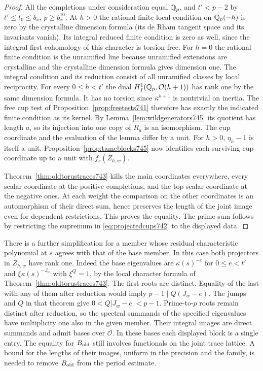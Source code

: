 \documentclass[a4paper,11pt]{article}
\theoremstyle{definition}
\theoremstyle{remark}
\numberwithin{equation}{section}
\begin{document}
\begin{proof}
All the completions under consideration equal \(\mathbb Q_p\),
and \(t'<p-2\) by \(t'\le t_0\le b_x\), \(p\ge b_x^{10}\).
At \(h>0\) the rational finite local condition on
\(\mathbb Q_p(-h)\) is zero by the crystalline dimension formula
(its de Rham tangent space and its invariants vanish).
Its integral reduced finite condition is zero as well, since
the integral first cohomology of this character is torsion-free.
For \(h=0\) the rational finite condition is the unramified line
because unramified extensions are crystalline and the crystalline
dimension formula gives dimension one. The integral condition and
its reduction consist of all unramified classes by local reciprocity.
For every \(0\le h<t'\) the dual \(H^1_f(\mathbb Q_p,\mathcal O(h+1))\)
has rank one by the same dimension formula. It has no torsion
since \(\bar\kappa^{h+1}\) is nontrivial on inertia. The free
cup test of Proposition~\ref{prop:freetests741} therefore
has exactly the indicated finite condition as its kernel.
By Lemma~\ref{lem:wildgenerators745} its quotient has length
\(a\), so its injection into one copy of \(R_a\) is an
isomorphism. The cup coordinate and the evaluation of the lemma
differ by a unit. For \(h>0\), \(\eta_h-1\) is itself a unit.
Proposition~\ref{prop:tameblocks745} now identifies each
surviving cup coordinate up to a unit with \(f_c(Z_{h,w})\).

Theorem~\ref{thm:oldtorustraces743} kills the main coordinates
everywhere, every scalar coordinate at the positive completions,
and the top scalar coordinate at the negative ones. At each weight
the comparison on the other coordinates is an automorphism of
their direct sum, hence preserves the length of the joint image
even for dependent restrictions. This proves the equality. The
prime sum follows by restricting the supremum in
\eqref{eq:projectedcups742} to the displayed data.
\end{proof}

There is a further simplification for a member whose residual
characteristic polynomial at \(s\) agrees with that of the base
member. In this case both projectors in \(Z_{h,w}\) have rank one.
Indeed the base eigenvalues are \(\kappa(s)^{-e}\) for
\(0\le e<t'\) and \(\xi\kappa(s)^{-J_w}\) with \(\xi^Q=1\),
by the local character formula of Theorem~\ref{thm:oldtorustraces743}.
The first roots are distinct. Equality of the last with any of
them after reduction would imply \(p-1\mid Q(J_w-e)\).
The jumps and \(Q\) in that theorem give
\(0<Q|J_w-e|<p-1\). Prime-to-\(p\) roots remain distinct after
reduction, so the spectral summands of the specified eigenvalues
have multiplicity one also in the given member. Their integral
images are direct summands and admit bases over \(\mathcal O\).
In these bases each displayed block is a single entry. The
equality for \(B_{\rm old}\) still involves functionals on the
joint trace lattice. A bound for the lengths of their images,
uniform in the precision and the family, is needed to remove
\(B_{\rm old}\) from the period estimate.
\clearpage
\end{document}
